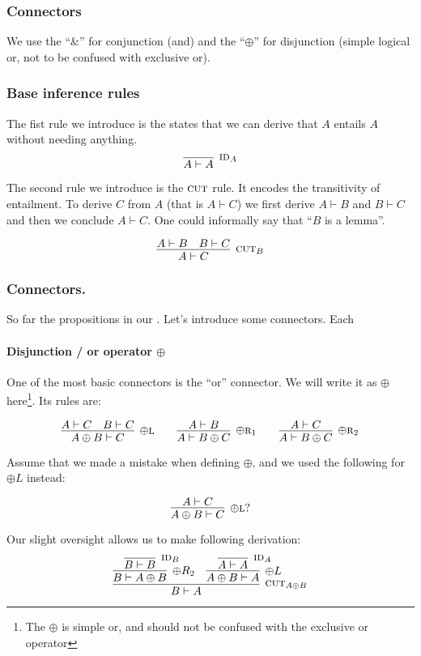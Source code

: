 \documentclass{article}
\begin{document}
\subsubsection{Connectors}

We use the ``\(\&\)'' for conjunction (and) and the ``\(\oplus\)'' for
disjunction (simple logical or, not to be confused with exclusive or).

\subsubsection{Base inference rules}
The fist rule we introduce is the states that we can derive that \(A\) entails \(A\) without needing anything. 
\[
\infer[\textsc{id}_A]{A \vdash A}{}
\]

The second rule we introduce is the \(\textsc{cut}\) rule. It encodes the transitivity of entailment. To derive \(C\) from \(A\) (that is \(A \vdash C\)) we first derive \(A \vdash B\) and \(B \vdash C\) and then we conclude \(A \vdash C\). One could informally say that ``\(B\) is a lemma''.

\[
\infer[\textsc{cut}_B]
{A \vdash C}{A \vdash B & B \vdash C}
\]


\subsubsection{Connectors.} 
So far the propositions in our . Let's introduce some connectors. Each 

\paragraph{Disjunction / or operator \(\oplus\)}
One of the most basic connectors is the ``or'' connector. We will write it as \(\oplus\) here\footnote{The \(\oplus\) is simple or, and should not be confused with the exclusive or operator}. Its rules are:

\[
\infer[\oplus\textsc{l}]
{A \oplus B \vdash C}{A \vdash C & B \vdash C}
\qquad
\infer[\oplus\textsc{r}_1]
{A \vdash B \oplus C}{A \vdash B}
\qquad
\infer[\oplus\textsc{r}_2]
{A \vdash B \oplus C}{A \vdash C}
\]




Assume that we made a mistake when defining \( \oplus \), and we used the following for \(\oplus L\) instead:

\[
\infer[\oplus \textsc{l}?]{A \oplus B \vdash C}{A \vdash C}
\]

Our slight oversight allows us to make following derivation:
\[
\infer[\textsc{cut}_{A \oplus B}]
{B \vdash A}
{
	\infer[\oplus R_2]
	{B \vdash A \oplus B}
	{
		\infer[\textsc{id}_B]
		{B \vdash B}
		{}
	}
	&
	\infer[\oplus L]
	{A \oplus B \vdash A}
	{
		\infer[\textsc{id}_A]
		{A \vdash A}
		{}
	}
}
\]
\end{document}
